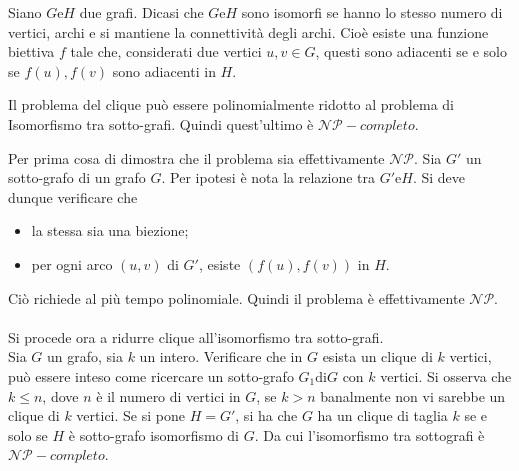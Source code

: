 \documentclass{subfiles}
\begin{document}
\begin{Definition*}
    Siano \(G \text{e} H\) due grafi. Dicasi che \(G \text{e} H\) sono isomorfi se hanno lo stesso numero di vertici, archi e si mantiene la connettività degli archi.
    Cioè esiste una funzione biettiva \(f\) tale che, considerati due vertici \(u, v \in G\), questi sono adiacenti se e solo se \(f(u), f(v)\) sono adiacenti in \(H\).
\end{Definition*}

\begin{Theorem}
    Il problema del clique può essere polinomialmente ridotto al problema di Isomorfismo tra sotto-grafi. Quindi quest'ultimo è \(\mathcal{NP}-completo\).
    \begin{Proof*}
        Per prima cosa di dimostra che il problema sia effettivamente \(\mathcal{NP}\). Sia \(G'\) un sotto-grafo di un grafo \(G\).
        Per ipotesi è nota la relazione tra \(G' \text{e} H\). Si deve dunque verificare che
        \begin{itemize}
            \item la stessa sia una biezione;
            \item per ogni arco \((u, v)\) di \(G'\), esiste \((f(u), f(v))\) in \(H\).
        \end{itemize}
        Ciò richiede al più tempo polinomiale. Quindi il problema è effettivamente \(\mathcal{NP}\).
        \\ \\
        Si procede ora a ridurre clique all'isomorfismo tra sotto-grafi. \\
        Sia \(G\) un grafo, sia \(k\) un intero.
        Verificare che in \(G\) esista un clique di \(k\) vertici, può essere inteso come ricercare un sotto-grafo \(G_{1} \text{di} G\) con \(k\) vertici.
        Si osserva che \(k \le n\), dove \(n\) è il numero di vertici in \(G\), se \(k > n\) banalmente non vi sarebbe un clique di \(k\) vertici.
        Se si pone \(H = G'\), si ha che \(G\) ha un clique di taglia \(k\) se e solo se \(H\) è sotto-grafo isomorfismo di \(G\).
        Da cui l'isomorfismo tra sottografi è \(\mathcal{NP}-completo\).
    \end{Proof*}
\end{Theorem}
\end{document}
